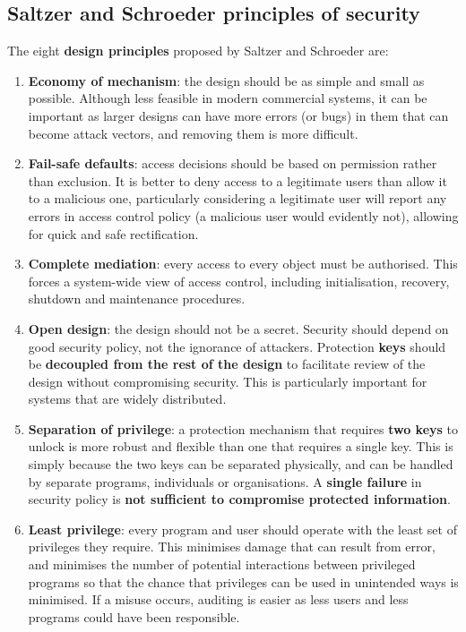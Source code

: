 \documentclass{article}
\begin{document}
\subsection{Saltzer and Schroeder principles of security}
The eight \textbf{design principles} proposed by Saltzer and Schroeder are:
\begin{enumerate}
	\item \textbf{Economy of mechanism}: the design should be as simple and small as possible. Although less feasible in modern commercial systems, it can be important as larger designs can have more errors (or bugs) in them that can become attack vectors, and removing them is more difficult.
	\item \textbf{Fail-safe defaults}: access decisions should be based on permission rather than exclusion. It is better to deny access to a legitimate users than allow it to a malicious one, particularly considering a legitimate user will report any errors in access control policy (a malicious user would evidently not), allowing for quick and safe rectification.
	\item \textbf{Complete mediation}: every access to every object must be authorised. This forces a system-wide view of access control, including initialisation, recovery, shutdown and maintenance procedures.
	\item \textbf{Open design}: the design should not be a secret. Security should depend on good security policy, not the ignorance of attackers. Protection \textbf{keys} should be \textbf{decoupled from the rest of the design} to facilitate review of the design without compromising security. This is particularly important for systems that are widely distributed.
	\item \textbf{Separation of privilege}: a protection mechanism that requires \textbf{two keys} to unlock is more robust and flexible than one that requires a single key. This is simply because the two keys can be separated physically, and can be handled by separate programs, individuals or organisations. A \textbf{single failure} in security policy is \textbf{not sufficient to compromise protected information}.
	\item \textbf{Least privilege}: every program and user should operate with the least set of privileges they require. This minimises damage that can result from error, and minimises the number of potential interactions between privileged programs so that the chance that privileges can be used in unintended ways is minimised. If a misuse occurs, auditing is easier as less users and less programs could have been responsible.

\end{enumerate}
\end{document}
